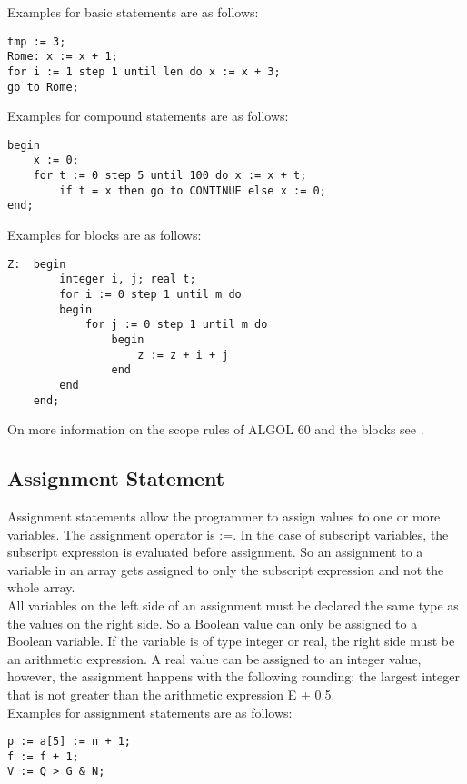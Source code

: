 \documentclass{article}
\begin{document}
Examples for basic statements are as follows:\\ 
\begin{lstlisting}[language={[60]algol}]
tmp := 3;
Rome: x := x + 1;
for i := 1 step 1 until len do x := x + 3;
go to Rome;
\end{lstlisting}

Examples for compound statements are as follows:\\
\begin{lstlisting}[language={[60]algol}]
begin
    x := 0;
    for t := 0 step 5 until 100 do x := x + t;
        if t = x then go to CONTINUE else x := 0;
end;
\end{lstlisting}

Examples for blocks are as follows:\\ 
\begin{lstlisting}[language={[60]algol}]
Z:  begin 
        integer i, j; real t;
        for i := 0 step 1 until m do
        begin
            for j := 0 step 1 until m do
                begin
                    z := z + i + j
                end
        end
    end;
\end{lstlisting}

On more information on the scope rules of ALGOL 60 and the blocks see .

\subsection{Assignment Statement} \label{assigStat}
Assignment statements allow the programmer to assign values to one or more variables. The assignment operator is :=. In the case of subscript variables, the subscript expression is evaluated before assignment. So an assignment to a variable in an array gets assigned to only the subscript expression and not the whole array. \\
All variables on the left side of an assignment must be declared the same type as the values on the right side. So a Boolean value can only be assigned to a Boolean variable. If the variable is of type integer or real, the right side must be an arithmetic expression. A real value can be assigned to an integer value, however, the assignment happens with the following rounding: the largest integer that is not greater than the arithmetic expression E + 0.5.\\

Examples for assignment statements are as follows:\\ 
\begin{lstlisting}[language={[60]algol}]
p := a[5] := n + 1;
f := f + 1;
V := Q > G & N;
\end{lstlisting}
\end{document}
